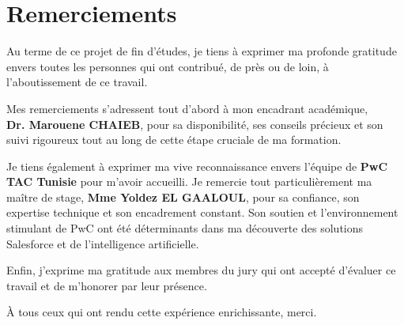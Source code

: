 \chapter*{Remerciements}

Au terme de ce projet de fin d'études, je tiens à exprimer ma profonde gratitude envers toutes les personnes qui ont contribué, de près ou de loin, à l'aboutissement de ce travail.

Mes remerciements s'adressent tout d'abord à mon encadrant académique,\\ \textbf{Dr. Marouene CHAIEB}, pour sa disponibilité, ses conseils précieux et son suivi rigoureux tout au long de cette étape cruciale de ma formation.

Je tiens également à exprimer ma vive reconnaissance envers l'équipe de \textbf{PwC TAC Tunisie} pour m'avoir accueilli. Je remercie tout particulièrement ma maître de stage, \textbf{Mme Yoldez EL GAALOUL}, pour sa confiance, son expertise technique et son encadrement constant. Son soutien et l'environnement stimulant de PwC ont été déterminants dans ma découverte des solutions Salesforce et de l'intelligence artificielle.

Enfin, j'exprime ma gratitude aux membres du jury qui ont accepté d'évaluer ce travail et de m'honorer par leur présence.

À tous ceux qui ont rendu cette expérience enrichissante, merci.

